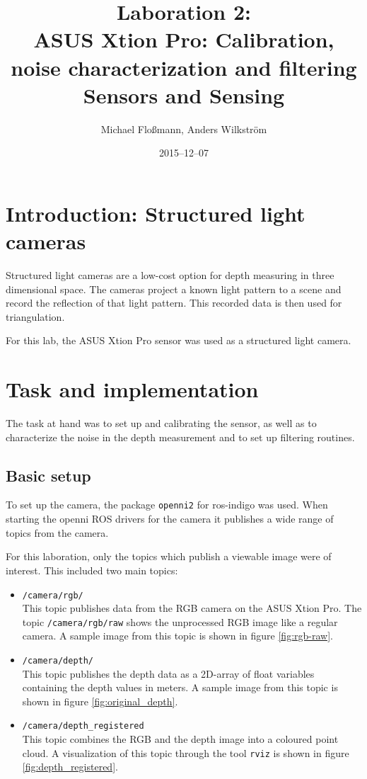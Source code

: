 \documentclass[DIV12,a4paper]{scrartcl}
\title{Laboration 2:\\ ASUS Xtion Pro: Calibration, noise characterization and filtering\\{\small Sensors and Sensing}}
\author{Michael Flo{\ss}mann, Anders Wilkstr\"om}
\date{2015--12--07}
\begin{document}
\maketitle

\section{Introduction: Structured light cameras}
Structured light cameras are a low-cost option for depth measuring in three dimensional space. The cameras project a known light pattern to a scene and record the reflection of that light pattern. This recorded data is then used for triangulation.\par
For this lab, the ASUS Xtion Pro sensor was used as a structured light camera.
\section{Task and implementation}
The task at hand was to set up and calibrating the sensor, as well as to characterize the noise in the depth measurement and to set up filtering routines.
\subsection{Basic setup}
To set up the camera, the package \texttt{openni2} for ros-indigo was used. %
When starting the openni ROS drivers for the camera it publishes a wide range of topics from the camera.\par %
For this laboration, only the topics which publish a viewable image were of interest. This included two main topics:%


\begin{itemize}
  \item \texttt{/camera/rgb/}\\
    This topic publishes data from the RGB camera on the ASUS Xtion Pro. The topic \texttt{/camera/rgb/raw} shows the unprocessed RGB image like a regular camera. A sample image from this topic is shown in figure \ref{fig:rgb-raw}.
  \item \texttt{/camera/depth/}\\
    This topic publishes the depth data as a 2D-array of float variables containing the depth values in meters. A sample image from this topic is shown in figure \ref{fig:original_depth}.
  \item \texttt{/camera/depth\_registered}\\
    This topic combines the RGB and the depth image into a coloured point cloud. A visualization of this topic through the tool \texttt{rviz} is shown in figure \ref{fig:depth_registered}.
\end{itemize}
\end{document}
